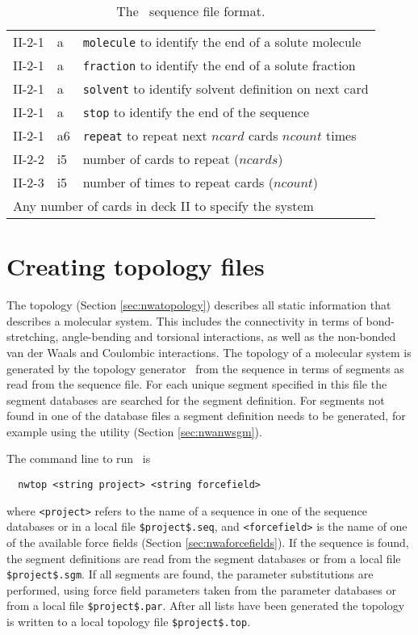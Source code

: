 \begin{table}[htbp]
\begin{center}
\begin{tabular*}{150mm}{p{15mm}p{12mm}l}
II-2-1 & a      & \verb+molecule+ to identify the end of a solute molecule\\
II-2-1 & a      & \verb+fraction+ to identify the end of a solute fraction\\
II-2-1 & a      & \verb+solvent+ to identify solvent definition on next card\\
II-2-1 & a      & \verb+stop+ to identify the end of the sequence\\
II-2-1 & a6     & \verb+repeat+ to repeat next $ncard$ cards $ncount$
times\\
II-2-2 & i5     & number of cards to repeat ($ncards$)\\
II-2-3 & i5     & number of times to repeat cards ($ncount$)\\
\multicolumn{3}{l}{Any number of cards in deck II to specify the system} \\
\hline\hline
\end{tabular*}
\caption{The \nwargos\ sequence file format.\label{tbl:nwaseq}}
\end{center}
\end{table}

\section{Creating topology files}
\label{sec:nwanwtop}

The topology (Section \ref{sec:nwatopology}) describes all static information
that describes a molecular system. This includes the connectivity in
terms of bond-stretching, angle-bending and torsional interactions, as well as
the non-bonded van der Waals and Coulombic interactions.
The topology of a molecular system is generated by the topology
generator \nwtop\ from the sequence in terms of segments as read from
the sequence file. For each unique segment specified in this file the 
segment databases are searched for the segment definition. For
segments not found in one of the database files a segment definition
needs to be generated, for example using the utility \nwsgm (Section \ref{sec:nwanwsgm}).

The command line to run \nwtop\ is
\begin{verbatim}
  nwtop <string project> <string forcefield>
\end{verbatim}
where \verb+<project>+ refers to the name of a sequence in one of the
sequence databases or in a local file \verb+$project$.seq+, and
\verb+<forcefield>+ is the name of one of the available force fields 
(Section \ref{sec:nwaforcefields}).
If the sequence is found, the segment definitions are read from the
segment databases or from a local file \verb+$project$.sgm+. If all
segments are found, the parameter substitutions are performed, using
force field parameters taken from the parameter databases or from a 
local file \verb+$project$.par+. After all lists have been generated the
topology is written to a local topology file \verb+$project$.top+.


